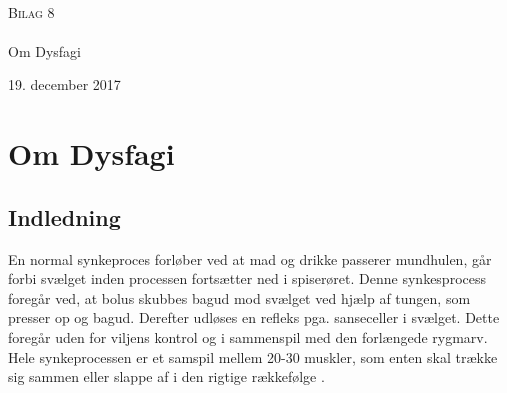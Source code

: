 

\begin{titlingpage}
\begin{center}

~ \\[3cm]


\textsc{\LARGE Bilag 8}\\[1.5cm]


\noindent\makebox[\linewidth]{\rule{\textwidth}{0.4pt}}\\
[0.5cm]{\Huge Om Dysfagi}
\noindent\makebox[\linewidth]{\rule{\textwidth}{0.4pt}}
\end{center}
\vfill
\begin{center}
{\large 19. december 2017}
\end{center}
\end{titlingpage}

\newpage
\tableofcontents*
\newpage


\chapter{Om Dysfagi}
\section{Indledning}
En normal synkeproces forløber ved at mad og drikke passerer mundhulen, går forbi svælget inden processen fortsætter ned i spiserøret. Denne synkesprocess foregår ved, at bolus skubbes bagud mod svælget ved hjælp af tungen, som presser op og bagud. Derefter udløses en refleks pga. sanseceller i svælget. Dette foregår uden for viljens kontrol og i sammenspil med den forlængede rygmarv. Hele synkeprocessen er et samspil mellem 20-30 muskler, som enten skal trække sig sammen eller slappe af i den rigtige rækkefølge \cite{Sand2008}. 

